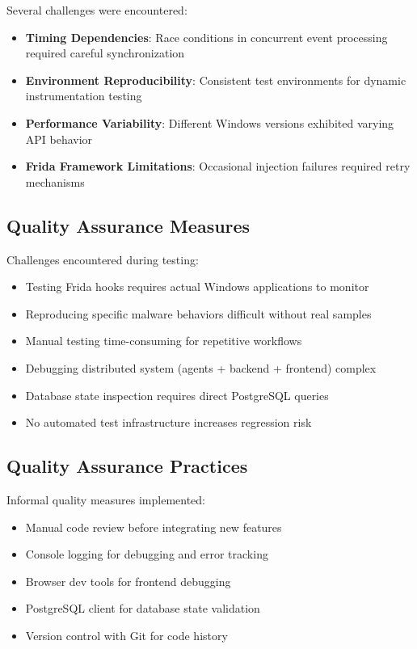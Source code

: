 \begin{itemize}
Several challenges were encountered:

\begin{itemize}
    \item \textbf{Timing Dependencies}: Race conditions in concurrent event processing required careful synchronization
    \item \textbf{Environment Reproducibility}: Consistent test environments for dynamic instrumentation testing
    \item \textbf{Performance Variability}: Different Windows versions exhibited varying API behavior
    \item \textbf{Frida Framework Limitations}: Occasional injection failures required retry mechanisms
\end{itemize}

\subsection{Quality Assurance Measures}

Challenges encountered during testing:

\begin{itemize}
    \item Testing Frida hooks requires actual Windows applications to monitor
    \item Reproducing specific malware behaviors difficult without real samples
    \item Manual testing time-consuming for repetitive workflows
    \item Debugging distributed system (agents + backend + frontend) complex
    \item Database state inspection requires direct PostgreSQL queries
    \item No automated test infrastructure increases regression risk
\end{itemize}

\subsection{Quality Assurance Practices}

Informal quality measures implemented:

\begin{itemize}
    \item Manual code review before integrating new features
    \item Console logging for debugging and error tracking
    \item Browser dev tools for frontend debugging
    \item PostgreSQL client for database state validation
    \item Version control with Git for code history
\end{itemize}


\end{itemize}

